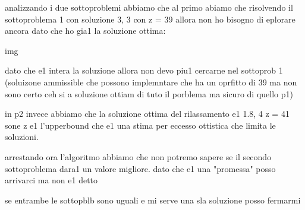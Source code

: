 analizzando i due sottoproblemi abbiamo che al primo abiamo che risolvendo il sottoproblema 1 con soluzione 3, 3 con z = 39 allora non ho bisogno di eplorare ancora dato che ho gia1 la soluzione ottima:

img

dato che e1 intera la soluzione allora non devo piu1 cercarne nel sottoprob 1 (soluizone ammissible che possono implemntare che ha un oprfitto di 39 ma non sono certo ceh si a soluzione ottiam di tuto il porblema ma sicuro di quello p1)


in p2 invece abbiamo che la soluzione ottima del rilassamento e1 1.8, 4 z = 41 sone z e1 l'upperbound che e1 una stima per eccesso ottistica che limita le soluzioni.

arrestando ora l'algoritmo abbiamo che non potremo sapere se il secondo sottoproblema dara1 un valore migliore. dato che e1 una "promessa" posso arrivarci ma non e1 detto

se entrambe le sottopblb sono uguali e mi serve una sla soluzione posso fermarmi